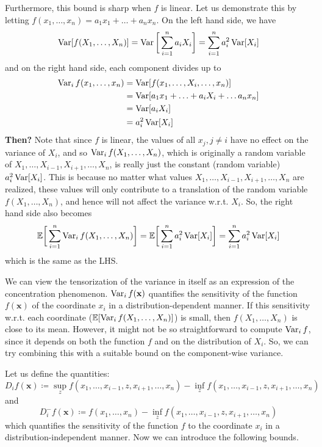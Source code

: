   Furthermore, this bound is sharp when $f$ is linear. Let us demonstrate this by letting $f(x_1, \ldots, x_n) = a_1 x_1 + \ldots + a_n x_n$. On the left hand side, we have 
  \[\operatorname{Var}[ f(X_1, \ldots, X_n)] = \operatorname{Var}\bigg[ \sum_{i=1}^n a_i X_i \bigg] = \sum_{i=1}^n a_i^2 \operatorname{Var}[X_i] \]
  and on the right hand side, each component divides up to 
  \begin{align*}
      \operatorname{Var}_i f(x_1, \ldots, x_n ) & = \operatorname{Var}[ f(x_1, \ldots, X_i, \ldots, x_n)] \\
      & = \operatorname{Var}[ a_1 x_1 + \ldots + a_i X_i + \ldots a_n x_n] \\
      & = \operatorname{Var}[a_i X_i] \\
      & = a_i^2 \operatorname{Var}[X_i]
  \end{align*}
  \textbf{Then?} Note that since $f$ is linear, the values of all $x_j, j \neq i$ have no effect on the variance of $X_i$, and so $\operatorname{Var}_i f(X_1, \ldots, X_n)$, which is originally a random variable of $X_1, \ldots, X_{i-1}, X_{i+1}, \ldots, X_n$, is really just the constant (random variable) $a_i^2 \operatorname{Var}[X_i]$. This is because no matter what values $X_1, \ldots, X_{i-1}, X_{i+1}, \ldots, X_n$ are realized, these values will only contribute to a translation of the random variable $f(X_1, \ldots, X_n)$, and hence will not affect the variance w.r.t. $X_i$. So, the right hand side also becomes 
  \[\mathbb{E} \bigg[ \sum_{i=1}^n \operatorname{Var}_i f(X_1, \ldots, X_n) \bigg] = \mathbb{E} \bigg[ \sum_{i=1}^n a_i^2 \operatorname{Var}[X_i] \bigg] = \sum_{i=1}^n a_i^2 \operatorname{Var}[X_i]\]
  which is the same as the LHS. 

  We can view the tensorization of the variance in itself as an expression of the concentration phenomenon. $\operatorname{Var}_i f (\mathbf{x})$ quantifies the sensitivity of the function $f(\mathbf{x})$ of the coordinate $x_i$ in a distribution-dependent manner. If this sensitivity w.r.t. each coordinate ($\mathbb{E}[ \operatorname{Var}_i f(X_1, \ldots, X_n)]$) is small, then $f(X_1, \ldots, X_n)$ is close to its mean. However, it might not be so straightforward to compute $\operatorname{Var}_i f$, since it depends on both the function $f$ and on the distribution of $X_i$. So, we can try combining this with a suitable bound on the component-wise variance. 

  Let us define the quantities: 
  \[D_i f (\mathbf{x}) \coloneqq \sup_z f(x_1, \ldots, x_{i-1}, z, x_{i+1}, \ldots, x_n) - \inf_z f(x_1, \ldots, x_{i-1}, z, x_{i+1}, \ldots, x_n)\]
  and 
  \[D_i^- f(\mathbf{x}) \coloneqq f(x_1, \ldots, x_n) - \inf_z f(x_1, \ldots, x_{i-1}, z, x_{i+1}, \ldots, x_n)\]
  which quantifies the sensitivity of the function $f$ to the coordinate $x_i$ in a distribution-independent manner. Now we can introduce the following bounds. 

